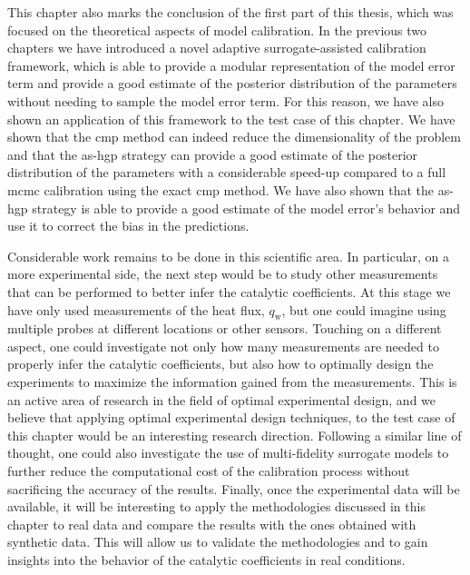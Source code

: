 \smallskip
This chapter also marks the conclusion of the first part of this thesis, which was focused on the theoretical aspects of model calibration. In the previous two chapters we have introduced a novel adaptive surrogate-assisted calibration framework, which is able to provide a modular representation of the model error term and provide a good estimate of the posterior distribution of the parameters without needing to sample the model error term. For this reason, we have also shown an application of this framework to the test case of this chapter. We have shown that the \gls{cmp} method can indeed reduce the dimensionality of the problem and that the \gls{as}-\gls{hgp} strategy can provide a good estimate of the posterior distribution of the parameters with a considerable speed-up compared to a full \gls{mcmc} calibration using the exact \gls{cmp} method. We have also shown that the \gls{as}-\gls{hgp} strategy is able to provide a good estimate of the model error's behavior and use it to correct the bias in the predictions. 

\smallskip
Considerable work remains to be done in this scientific area. In particular, on a more experimental side, the next step would be to study other measurements that can be performed to better infer the catalytic coefficients. At this stage we have only used measurements of the heat flux, $q_{\mathrm{w}}$, but one could imagine using multiple probes at different locations or other sensors. Touching on a different aspect, one could investigate not only how many measurements are needed to properly infer the catalytic coefficients, but also how to optimally design the experiments to maximize the information gained from the measurements. This is an active area of research in the field of optimal experimental design, and we believe that applying optimal experimental design techniques, to the test case of this chapter would be an interesting research direction. Following a similar line of thought, one could also investigate the use of multi-fidelity surrogate models to further reduce the computational cost of the calibration process without sacrificing the accuracy of the results. Finally, once the experimental data will be available, it will be interesting to apply the methodologies discussed in this chapter to real data and compare the results with the ones obtained with synthetic data. This will allow us to validate the methodologies and to gain insights into the behavior of the catalytic coefficients in real conditions.